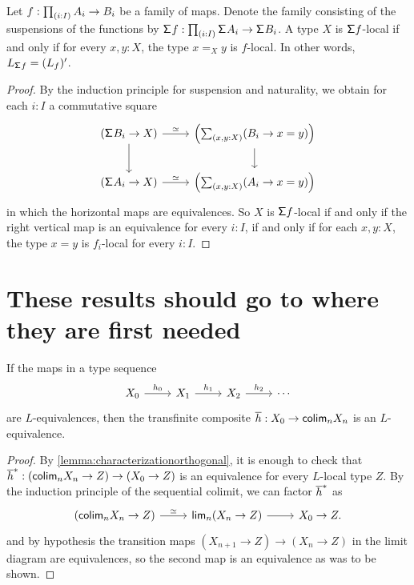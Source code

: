 \begin{lem}\label{lemma:characterizationsigmaflocal}
    Let $f:\prd{i:I}A_i\to B_i$ be a family of maps. Denote the family consisting of the suspensions
    of the functions by $\susp{f} : \prd{i:I} \susp{A_i} \to \susp{B_i}$.
    A type $X$ is $\mathsf{\Sigma} f$-local if and only if for every $x,y : X$, the type
    $x =_X y$ is $f$-local.
    In other words, $L_{\mathsf{\Sigma}^{}{f}} = (L_{f})'$.
\end{lem}

\begin{proof}
    By the induction principle for suspension and naturality, we obtain for each $i : I$ a commutative square
\[
  \begin{tikzcd}
    (\susp{B_i} \to X) \arrow[r,"\simeq"] \arrow[d] & \left( \sm{x,y:X} (B_i \to x = y) \right) \arrow[d] \\
    (\susp{A_i} \to X) \arrow[r,"\simeq"] & \left( \sm{x,y:X} (A_i \to x = y) \right)
  \end{tikzcd}
\]
in which the horizontal maps are equivalences.
So $X$ is $\mathsf{\Sigma} f$-local if and only if the right vertical map is an equivalence
for every $i : I$, if and only if for each $x,y : X$, the type $x = y$ is $f_i$-local
for every $i : I$.
\end{proof}

\section{These results should go to where they are first needed}
\begin{lem}\label{lemma:orthogonalcomposition}
    If the maps in a type sequence
\begin{equation*}
\begin{tikzcd}
X_0 \arrow[r,"h_0"] & X_1 \arrow[r,"h_1"] & X_2 \arrow[r,"h_2"] & \cdots
\end{tikzcd}
\end{equation*}
    are $L$-equivalences, then the transfinite composite $\overline{h} : X_0 \to \mathsf{colim}_n X_n$ is an $L$-equiva\-lence.
\end{lem}

\begin{proof}
    By \cref{lemma:characterizationorthogonal}, it is enough to check that
    ${\overline{h}}^\ast : (\mathsf{colim}_n X_n \to Z) \to (X_0 \to Z)$
    is an equivalence for every $L$-local type $Z$.
    By the induction principle of the sequential colimit,
    we can factor ${\overline{h}}^\ast$ as
\begin{equation*}
\begin{tikzcd}
(\colim_n X_n \to Z) \arrow[r,"\eqvsym"] & \mathsf{lim}_n (X_n\to Z) \arrow[r] & X_0\to Z.
\end{tikzcd}
\end{equation*}
    and by hypothesis the transition maps $(X_{n+1} \to Z) \to (X_n \to Z)$ in the limit diagram are equivalences,
    so the second map is an equivalence as was to be shown.
\end{proof}

